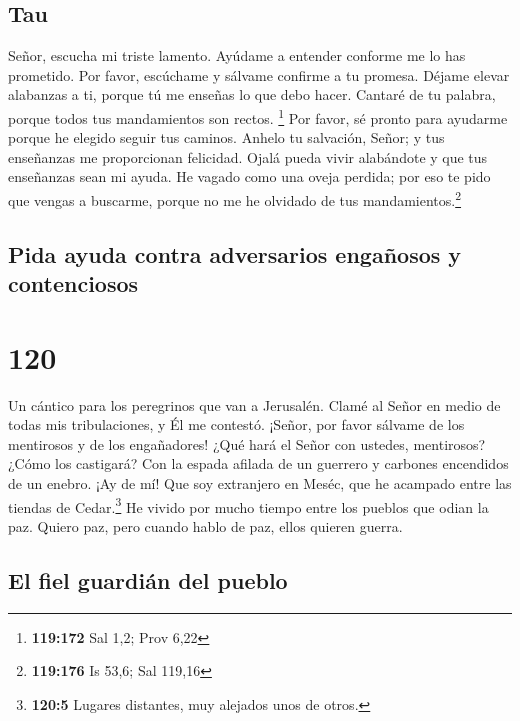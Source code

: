 \hypertarget{tau}{%
\subsection{Tau}\label{tau}}

 Señor, escucha mi triste lamento. Ayúdame a entender
conforme me lo has prometido.  Por favor, escúchame y
sálvame confirme a tu promesa.  Déjame elevar alabanzas
a ti, porque tú me enseñas lo que debo hacer.  Cantaré
de tu palabra, porque todos tus mandamientos son rectos. \footnote{\textbf{119:172}
  Sal 1,2; Prov 6,22}  Por favor, sé pronto para
ayudarme porque he elegido seguir tus caminos.  Anhelo
tu salvación, Señor; y tus enseñanzas me proporcionan felicidad.
 Ojalá pueda vivir alabándote y que tus enseñanzas sean
mi ayuda.  He vagado como una oveja perdida; por eso te
pido que vengas a buscarme, porque no me he olvidado de tus
mandamientos.\footnote{\textbf{119:176} Is 53,6; Sal 119,16}

\hypertarget{pida-ayuda-contra-adversarios-engauxf1osos-y-contenciosos}{%
\subsection{Pida ayuda contra adversarios engañosos y
contenciosos}\label{pida-ayuda-contra-adversarios-engauxf1osos-y-contenciosos}}

\hypertarget{section-119}{%
\section{120}\label{section-119}}

Un cántico para los peregrinos que van a Jerusalén.  Clamé
al Señor en medio de todas mis tribulaciones, y Él me contestó.
 ¡Señor, por favor sálvame de los mentirosos y de los
engañadores!  ¿Qué hará el Señor con ustedes, mentirosos?
¿Cómo los castigará?  Con la espada afilada de un guerrero
y carbones encendidos de un enebro.  ¡Ay de mí! Que soy
extranjero en Meséc, que he acampado entre las tiendas de
Cedar.\footnote{\textbf{120:5} Lugares distantes, muy alejados unos de
  otros.}  He vivido por mucho tiempo entre los pueblos
que odian la paz.  Quiero paz, pero cuando hablo de paz,
ellos quieren guerra.

\hypertarget{el-fiel-guardiuxe1n-del-pueblo}{%
\subsection{El fiel guardián del
pueblo}\label{el-fiel-guardiuxe1n-del-pueblo}}

